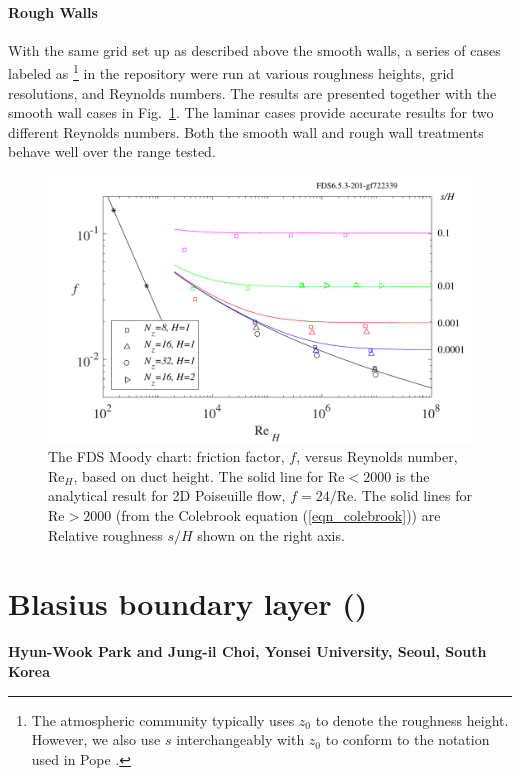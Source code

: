 \documentclass[11pt]{book}
\begin{document}
\paragraph{Rough Walls}

With the same grid set up as described above the smooth walls, a series of cases labeled as \footnote{The atmospheric community typically uses $z_0$ to denote the roughness height. However, we also use $s$ interchangeably with $z_0$ to conform to the notation used in Pope \cite{Pope:2000}.} in the repository \cite{FDS-SMV_repository} were run at various roughness heights, grid resolutions, and Reynolds numbers. The results are presented together with the smooth wall cases in Fig.~\ref{fig_fds_moody_chart}. The laminar cases provide accurate results for two different Reynolds numbers. Both the smooth wall and rough wall treatments behave well over the range tested.

\begin{figure}[ht]
\centering
\includegraphics[width=4.5in]{SCRIPT_FIGURES/fds_moody_chart}
\caption[FDS Moody chart]{The FDS Moody chart: friction factor, $f$, versus Reynolds number, Re$_H$, based on duct height. The solid line for $\mbox{Re} < 2000$ is the analytical result for 2D Poiseuille flow, $f=24/\mbox{Re}$. The solid lines for $\mbox{Re}>2000$ (from the Colebrook equation (\ref{eqn_colebrook})) are Relative roughness $s/H$ shown on the right axis.}
\label{fig_fds_moody_chart}
\end{figure}



\section{Blasius boundary layer (\texorpdfstring{}{blasius})}

\textbf{Hyun-Wook Park and Jung-il Choi, Yonsei University, Seoul, South Korea}\\
\end{document}
